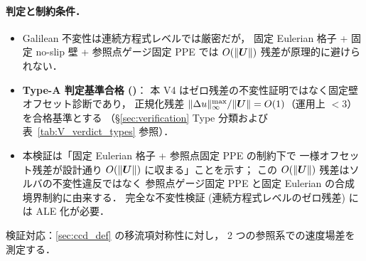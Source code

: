 \paragraph{判定と制約条件．}
\begin{itemize}\setlength{\itemsep}{0pt}
  \item Galilean 不変性は連続方程式レベルでは厳密だが，
        固定 Eulerian 格子 + 固定 no-slip 壁 + 参照点ゲージ固定 PPE では
        $O(\|\bm{U}\|)$ 残差が原理的に避けられない．
  \item \textbf{Type-A 判定基準合格 (\checkmark)}：
        本 V4 はゼロ残差の不変性証明ではなく固定壁オフセット診断であり，
        正規化残差 $\|\Delta u\|_\infty^{\max}/\|\bm{U}\| = O(1)$（運用上 $< 3$）を合格基準とする
        （§\ref{sec:verification} Type 分類および表~\ref{tab:V_verdict_types} 参照）．
  \item 本検証は「固定 Eulerian 格子 + 参照点固定 PPE の制約下で
        一様オフセット残差が設計通り $O(\|\bm{U}\|)$ に収まる」ことを示す；
        この $O(\|\bm{U}\|)$ 残差はソルバの不変性違反ではなく
        参照点ゲージ固定 PPE と固定 Eulerian の合成境界制約に由来する．
        完全な不変性検証 (連続方程式レベルのゼロ残差) には ALE 化が必要．
\end{itemize}
検証対応：\autoref{sec:ccd_def} の移流項対称性に対し，
2 つの参照系での速度場差を測定する．

\FloatBarrier
